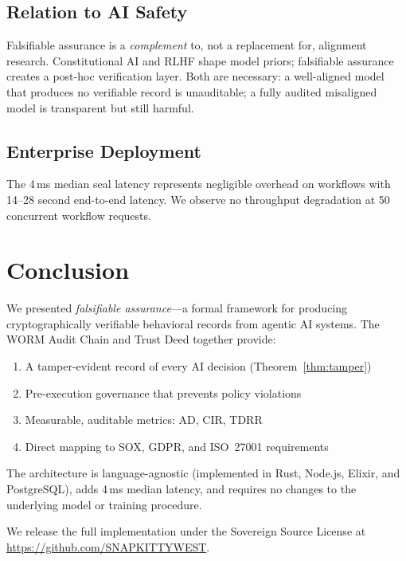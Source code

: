 \documentclass[12pt,letterpaper]{article}
\begin{document}
\subsection{Relation to AI Safety}

Falsifiable assurance is a \emph{complement} to, not a replacement for,
alignment research. Constitutional AI and RLHF shape model priors; falsifiable
assurance creates a post-hoc verification layer. Both are necessary: a
well-aligned model that produces no verifiable record is unauditable; a fully
audited misaligned model is transparent but still harmful.

\subsection{Enterprise Deployment}

The 4\,ms median seal latency represents negligible overhead on workflows with
14--28 second end-to-end latency. We observe no throughput degradation at
50 concurrent workflow requests.

\section{Conclusion}
\label{sec:conclusion}

We presented \emph{falsifiable assurance}---a formal framework for producing
cryptographically verifiable behavioral records from agentic AI systems.
The WORM Audit Chain and Trust Deed together provide:

\begin{enumerate}
  \item A tamper-evident record of every AI decision (Theorem~\ref{thm:tamper})
  \item Pre-execution governance that prevents policy violations
  \item Measurable, auditable metrics: AD, CIR, TDRR
  \item Direct mapping to SOX, GDPR, and ISO~27001 requirements
\end{enumerate}

The architecture is language-agnostic (implemented in Rust, Node.js, Elixir,
and PostgreSQL), adds 4\,ms median latency, and requires no changes to the
underlying model or training procedure.

We release the full implementation under the Sovereign Source License at
\url{https://github.com/SNAPKITTYWEST}.
\end{document}
